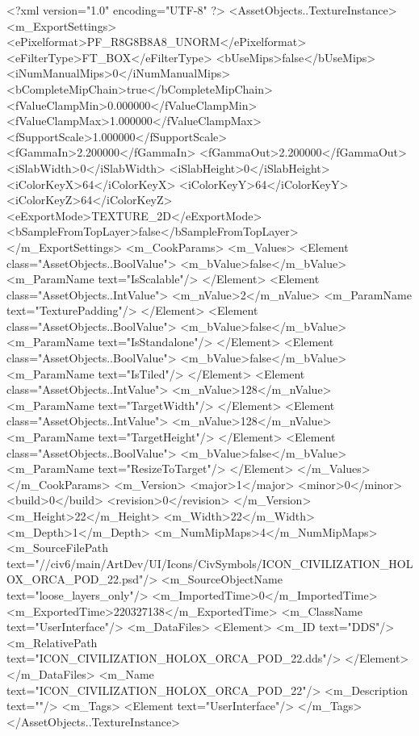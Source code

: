 <?xml version="1.0" encoding="UTF-8" ?>
<AssetObjects..TextureInstance>
	<m_ExportSettings>
		<ePixelformat>PF_R8G8B8A8_UNORM</ePixelformat>
		<eFilterType>FT_BOX</eFilterType>
		<bUseMips>false</bUseMips>
		<iNumManualMips>0</iNumManualMips>
		<bCompleteMipChain>true</bCompleteMipChain>
		<fValueClampMin>0.000000</fValueClampMin>
		<fValueClampMax>1.000000</fValueClampMax>
		<fSupportScale>1.000000</fSupportScale>
		<fGammaIn>2.200000</fGammaIn>
		<fGammaOut>2.200000</fGammaOut>
		<iSlabWidth>0</iSlabWidth>
		<iSlabHeight>0</iSlabHeight>
		<iColorKeyX>64</iColorKeyX>
		<iColorKeyY>64</iColorKeyY>
		<iColorKeyZ>64</iColorKeyZ>
		<eExportMode>TEXTURE_2D</eExportMode>
		<bSampleFromTopLayer>false</bSampleFromTopLayer>
	</m_ExportSettings>
	<m_CookParams>
		<m_Values>
			<Element class="AssetObjects..BoolValue">
				<m_bValue>false</m_bValue>
				<m_ParamName text="IsScalable"/>
			</Element>
			<Element class="AssetObjects..IntValue">
				<m_nValue>2</m_nValue>
				<m_ParamName text="TexturePadding"/>
			</Element>
			<Element class="AssetObjects..BoolValue">
				<m_bValue>false</m_bValue>
				<m_ParamName text="IsStandalone"/>
			</Element>
			<Element class="AssetObjects..BoolValue">
				<m_bValue>false</m_bValue>
				<m_ParamName text="IsTiled"/>
			</Element>
			<Element class="AssetObjects..IntValue">
				<m_nValue>128</m_nValue>
				<m_ParamName text="TargetWidth"/>
			</Element>
			<Element class="AssetObjects..IntValue">
				<m_nValue>128</m_nValue>
				<m_ParamName text="TargetHeight"/>
			</Element>
			<Element class="AssetObjects..BoolValue">
				<m_bValue>false</m_bValue>
				<m_ParamName text="ResizeToTarget"/>
			</Element>
		</m_Values>
	</m_CookParams>
	<m_Version>
		<major>1</major>
		<minor>0</minor>
		<build>0</build>
		<revision>0</revision>
	</m_Version>
	<m_Height>22</m_Height>
	<m_Width>22</m_Width>
	<m_Depth>1</m_Depth>
	<m_NumMipMaps>4</m_NumMipMaps>
	<m_SourceFilePath text="//civ6/main/ArtDev/UI/Icons/CivSymbols/ICON_CIVILIZATION_HOLOX_ORCA_POD_22.psd"/>
	<m_SourceObjectName text="loose_layers_only"/>
	<m_ImportedTime>0</m_ImportedTime>
	<m_ExportedTime>220327138</m_ExportedTime>
	<m_ClassName text="UserInterface"/>
	<m_DataFiles>
		<Element>
			<m_ID text="DDS"/>
			<m_RelativePath text="ICON_CIVILIZATION_HOLOX_ORCA_POD_22.dds"/>
		</Element>
	</m_DataFiles>
	<m_Name text="ICON_CIVILIZATION_HOLOX_ORCA_POD_22"/>
	<m_Description text=""/>
	<m_Tags>
		<Element text="UserInterface"/>
	</m_Tags>
</AssetObjects..TextureInstance>

